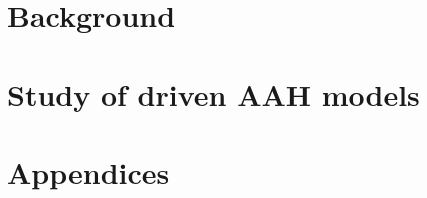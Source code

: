 \documentclass[12pt,a4paper,twoside,openany]{report}
\theoremstyle{definition}	\newtheorem{theorem}{Theorem}[section]
\begin{document}
  
  
  \part{Background}
  	
  
  
  
  
  \part{Study of driven AAH models}
  
  
  
%   
    
  \renewcommand{\thechapter}{\Alph{chapter}}
  \part{Appendices}
    
    
    
  \printbibliography
\end{document}
